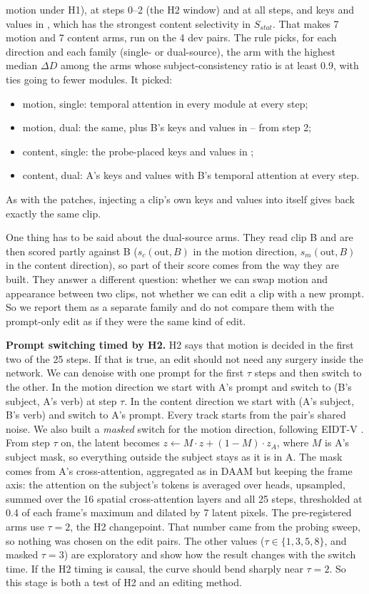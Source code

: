 \documentclass[twoside,english]{article}
\newcommand{\dD}{\Delta D}
\begin{document}
motion under H1), at steps 0--2 (the H2 window) and at all steps, and keys and values in
, which has the strongest content selectivity in $S_{stat}$. That makes 7 motion and
7 content arms, run on the 4 dev pairs. The rule picks, for each direction and each family (single- or
dual-source), the arm with the highest median $\dD$ among the arms whose subject-consistency ratio is at
least 0.9, with ties going to fewer modules. It picked:
\begin{itemize}
\item motion, single: temporal attention in every module at every step;
\item motion, dual: the same, plus B's keys and values in -- from step 2;
\item content, single: the probe-placed keys and values in ;
\item content, dual: A's keys and values with B's temporal attention at every step.
\end{itemize}
As with the patches, injecting a clip's own keys and values into itself gives back exactly the same clip.

One thing has to be said about the dual-source arms. They read clip B and are then scored partly
against B ($s_c(\text{out},B)$ in the motion direction, $s_m(\text{out},B)$ in the content direction), so
part of their score comes from the way they are built. They answer a different question: whether we can
swap motion and appearance between two clips, not whether we can edit a clip with a new prompt. So we
report them as a separate family and do not compare them with the prompt-only edit as if they were the
same kind of edit.

\textbf{Prompt switching timed by H2.} H2 says that motion is decided in the first two of the 25 steps.
If that is true, an edit should not need any surgery inside the network. We can denoise with one prompt
for the first $\tau$ steps and then switch to the other. In the motion direction we start with A's
prompt and switch to (B's subject, A's verb) at step $\tau$. In the content direction we start with (A's
subject, B's verb) and switch to A's prompt. Every track starts from the pair's shared noise. We also
built a \emph{masked} switch for the motion direction, following EIDT-V \citep{jagpal2025eidtv}. From step
$\tau$ on, the latent becomes $z \leftarrow M\cdot z + (1-M)\cdot z_A$, where $M$ is A's subject mask, so
everything outside the subject stays as it is in A. The mask comes from A's cross-attention, aggregated
as in DAAM \citep{tang2023daam} but keeping the frame axis: the attention on the subject's tokens is
averaged over heads, upsampled, summed over the 16 spatial cross-attention layers and all 25 steps,
thresholded at 0.4 of each frame's maximum and dilated by 7 latent pixels. The pre-registered arms use
$\tau = 2$, the H2 changepoint. That number came from the probing sweep, so nothing was chosen on the edit
pairs. The other values ($\tau \in \{1, 3, 5, 8\}$, and masked $\tau = 3$) are exploratory and show how
the result changes with the switch time. If the H2 timing is causal, the curve should bend sharply near
$\tau = 2$. So this stage is both a test of H2 and an editing method.
\end{document}
